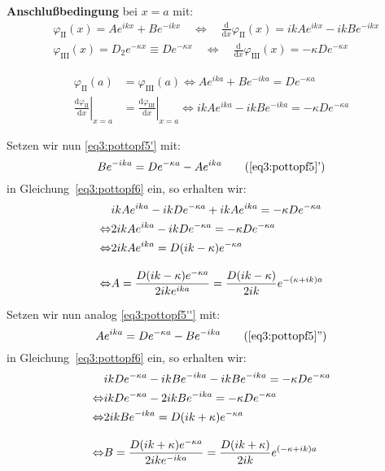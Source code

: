 \textbf{Anschlußbedingung} bei $x=a$ mit:
\begin{align*}
   &\varphi_\text{II}(x) = A e^{i k x}+B e^{-i k x} \quad
   \Leftrightarrow \quad  \frac {\text{d}}{\text{d}x}\varphi_\text{II}(x) 
   = ik Ae^{ikx}-ikBe^{-ikx}\\
   &\varphi_\text{III}(x) = D_2 e^{-\kappa x} \equiv D e^{-\kappa x} \quad
   \Leftrightarrow \quad \frac {\text{d}}{\text{d}x} \varphi_\text{III}(x) 
   = -\kappa D e^{-\kappa x}
\end{align*}

\begin{align}
  \varphi_\textrm{II} (a) &= \varphi_\textrm{III}(a)
   \Leftrightarrow  
   Ae^{ika}+Be^{-ika}=De^{-\kappa a} \label{eq3:pottopf5} \\
  \left.\frac{\text{d}\varphi_{\text{II}}}{\text{d}x}\right|_{x=a}
  &=\left.\frac{\text{d}\varphi_{\text{III}}}{\text{d}x}\right|_{x=a}
   \Leftrightarrow  
   ik Ae^{ika}-ik Be^{-ika}=-\kappa D e^{-\kappa a} \label{eq3:pottopf6}
\end{align}

Setzen wir nun \eqref{eq3:pottopf5'} mit:
\begin{equation}
  \label{eq3:pottopf5'}
   Be^{-ika}=De^{-\kappa a} - Ae^{ika}
   \tag{\ref{eq3:pottopf5}'}
\end{equation}
in Gleichung~\eqref{eq3:pottopf6} ein, so erhalten wir:
\begin{align}
  &ikAe^{ika}-ikDe^{-\kappa a}+ikAe^{ika}
   =-\kappa De^{-\kappa a}\label{eq3:pottopf7}\\
  \Leftrightarrow &2ikAe^{ika}-ikDe^{-\kappa a}
   =-\kappa De^{-\kappa a}\notag\\
   \Leftrightarrow &2ikAe^{ika}
   =D(ik-\kappa)e^{-\kappa a}\notag\\[2ex]
   \Leftrightarrow  &A
   = \frac{D(ik-\kappa) e^{-\kappa a}}
          {2ike^{ika}}
   =\frac{D(ik-\kappa)}{2ik}e^{-(\kappa+ik)a}\notag
\end{align}

Setzen wir nun analog \eqref{eq3:pottopf5''} mit:
\begin{equation}
  \label{eq3:pottopf5''}
   Ae^{ika}=De^{-\kappa a} - Be^{-ika}
   \tag{\ref{eq3:pottopf5}''}
\end{equation}
in Gleichung~\eqref{eq3:pottopf6} ein, so erhalten wir:
\begin{align}
   &ikDe^{-\kappa a}-ikBe^{-ika}-ikBe^{-ika}
   =-\kappa De^{-\kappa a}\label{eq3:pottopf8}\\
  \Leftrightarrow &ikDe^{-\kappa a}-2ikBe^{-ika}
   =-\kappa De^{-\kappa a}\notag\\
   \Leftrightarrow &2ikBe^{-ika}
   =D(ik+\kappa)e^{-\kappa a}\notag\\[2ex]
   \Leftrightarrow & B
   = \frac{D(ik+\kappa) e^{-\kappa a}}
          {2ike^{-ika}}
   =\frac{D(ik+\kappa)}{2ik}e^{(-\kappa+ik)a}\notag
\end{align}

